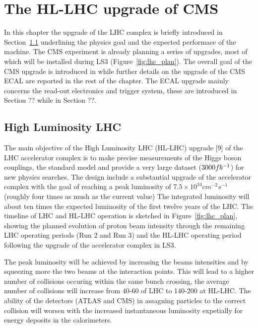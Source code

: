 \providecommand{\sixbysix}{\ensuremath{6\times 6\mathrm{~cm}^{2}}\xspace}
\providecommand{\threebythree}{\ensuremath{3\times 3\mathrm{~cm}^{2}}\xspace}
\providecommand{\twobytwo}{\ensuremath{2\times 2\mathrm{~cm}^{2}}\xspace}
\providecommand{\onebyone}{\ensuremath{1\times 1\mathrm{~cm}^{2}}\xspace}

\chapter{The HL-LHC upgrade of CMS}
\label{chapter:cms_upgrade}

In this chapter the upgrade of the LHC complex is briefly introduced in Section~\ref{upgrade_lhc}
underlining the physics goal and the expected performace of the machine. The CMS experiment is already planning
a series of upgrades, most of which will be installed during LS3 (Figure~\ref{fig:lhc_plan}).
The overall goal of the CMS upgrade is introduced in  while
further details on the upgrade of the CMS ECAL are reported in the rest of the chapter.
The ECAL upgrade mainly concerns the read-out electronics and trigger system, these are introduced in Section ??
while in Section ??.

\section{High Luminosity LHC}
\label{upgrade_lhc}

The main objective of the High Luminosity LHC (HL-LHC) upgrade [9] of the LHC accelerator complex
is to make precise measurements of the Higgs boson couplings, the standard model and provide a very
large dataset ($3000fb^{-1}$) for new physics searches.
The design include a substantial upgrade of the accelerator complex with the goal of reaching
a peak luminosity of $7.5\times10^{34} cm^{-2}s^{-1}$ (roughly four times as mush as the current value)
The integrated luminosity will about ten times the expected luminosity of the first twelve
years of the LHC.
The timeline of LHC and HL-LHC operation is sketched in Figure~\ref{fig:lhc_plan}, showing the planned
evolution of proton beam intensity through the remaining LHC operating periods (Run 2 and Run 3)
and the HL-LHC operating period following the upgrade of the accelerator complex in LS3.

The peak luminosity will be achieved by increasing the beams intensities and by squeezing more the two beams at the
interaction points. This will lead to a higher number of collisions occuring within the same bunch crossing, the
average number of collisions will increase from 40-60 of LHC to 140-200 at HL-LHC.
The ability of the detectors (ATLAS and CMS) in assagning particles to the correct collision will worsen with the
increased instantaneous luminosity expetially for energy deposits in the calorimeters.



